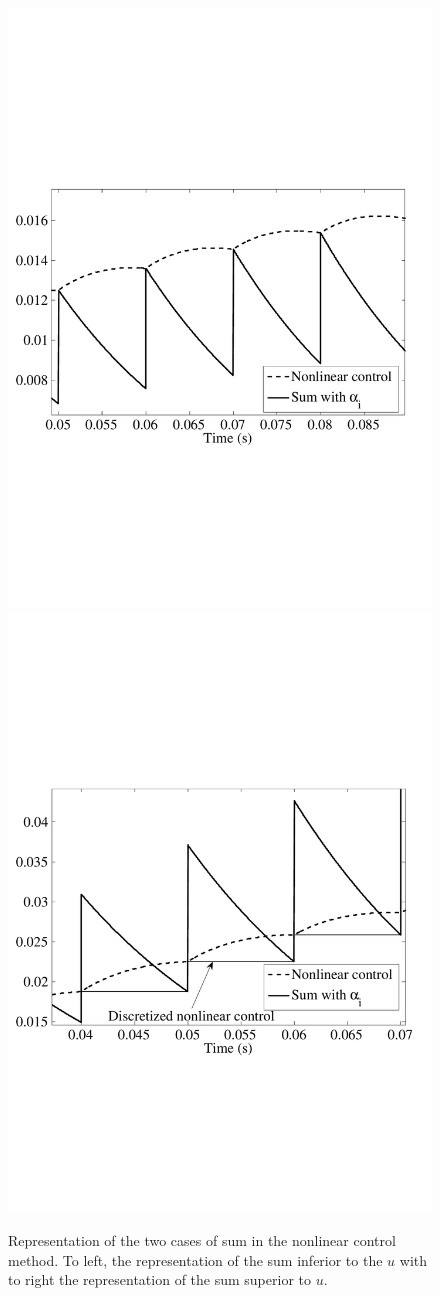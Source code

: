\documentclass[10pt,twocolumn,letterpaper, 
]{article}
\begin{document}
\begin{figure}[b!]
\centering
\vspace{-0.5cm}
\includegraphics[width=0.48\columnwidth]{preuvesdessous1.pdf}
\includegraphics[width=0.48\columnwidth]{preuvesdessus1.pdf}
\caption{Representation of the two cases of sum in the nonlinear control method. To left, the representation of the sum inferior to the $u$ with to right the representation of the sum superior to $u$.}
\end{figure}
\end{document}
